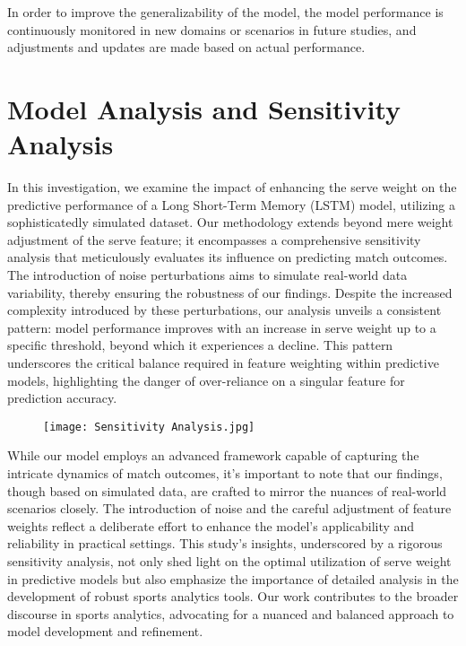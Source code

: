 \documentclass{mcmthesis}
\begin{document}
In order to improve the generalizability of the model, the model performance is continuously monitored in new domains or scenarios in future studies, and adjustments and updates are made based on actual performance.

\section{Model Analysis and Sensitivity Analysis}

In this investigation, we examine the impact of enhancing the serve weight on the predictive performance of a Long Short-Term Memory (LSTM) model, utilizing a sophisticatedly simulated dataset. Our methodology extends beyond mere weight adjustment of the serve feature; it encompasses a comprehensive sensitivity analysis that meticulously evaluates its influence on predicting match outcomes. The introduction of noise perturbations aims to simulate real-world data variability, thereby ensuring the robustness of our findings. Despite the increased complexity introduced by these perturbations, our analysis unveils a consistent pattern: model performance improves with an increase in serve weight up to a specific threshold, beyond which it experiences a decline. This pattern underscores the critical balance required in feature weighting within predictive models, highlighting the danger of over-reliance on a singular feature for prediction accuracy.

\begin{figure}[htbp]
    \centering
    \texttt{[image: Sensitivity Analysis.jpg]} %
    \label{fig:example} %
\end{figure}

While our model employs an advanced framework capable of capturing the intricate dynamics of match outcomes, it's important to note that our findings, though based on simulated data, are crafted to mirror the nuances of real-world scenarios closely. The introduction of noise and the careful adjustment of feature weights reflect a deliberate effort to enhance the model's applicability and reliability in practical settings. This study's insights, underscored by a rigorous sensitivity analysis, not only shed light on the optimal utilization of serve weight in predictive models but also emphasize the importance of detailed analysis in the development of robust sports analytics tools. Our work contributes to the broader discourse in sports analytics, advocating for a nuanced and balanced approach to model development and refinement.
\end{document}

